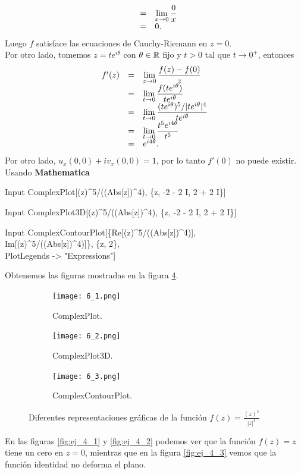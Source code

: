 \begin{Ejem}
\[\begin{array}{ccl}
			&=&\displaystyle\lim_{x\rightarrow 0}\dfrac{0}{x}\\
			&=&0.
		\end{array}
	\]	
	Luego $f$ satisface las ecuaciones de Cauchy-Riemann en $z=0$.\\
	Por otro lado, tomemos $z=te^{i\theta}$ con $\theta\in \mathbb{R}$ fijo y $t>0$  tal que $t\rightarrow0^{+}$, entonces
	\[
		\begin{array}{ccl}
			f'(z)&=&\displaystyle\lim_{z\rightarrow0}\displaystyle\dfrac{f(z)-f(0)}{z}\\
			&=&\displaystyle\lim_{t\rightarrow0}\dfrac{f(te^{i\theta})}{te^{i\theta}}\\
			&=&\displaystyle\lim_{t\rightarrow0}\dfrac{(te^{i\theta})^5/|te^{i\theta}|^4}{te^{i\theta}}\\
			&=&\displaystyle\lim_{t\rightarrow0}\dfrac{t^5e^{i4\theta}}{t^5}\\
			&=&e^{i4\theta}.
		\end{array}
	\]
	Por otro lado,  $u_x(0,0)+iv_x(0,0)=1$, por lo tanto $f'(0)$ no puede existir. \\
	Usando \textbf{Mathematica}
	\begin{mmaCell}{Input}
		ComplexPlot[(z)^5/((Abs[z])^4), \{z, -2 - 2 I, 2 + 2 I\}]
	\end{mmaCell}
	
	\begin{mmaCell}{Input}
		ComplexPlot3D[(z)^5/((Abs[z])^4), \{z, -2 - 2 I, 2 + 2 I\}]
	\end{mmaCell}
	
	\begin{mmaCell}{Input}
		ComplexContourPlot[\{Re[(z)^5/((Abs[z])^4)],\\Im[(z)^5/((Abs[z])^4)]\}, \{z, 2\},\\PlotLegends -> "Expressions"]
	\end{mmaCell}
	Obtenemos las figuras mostradas en la figura \ref{fig:ej_6}.\\	
	\begin{figure}[htbp!]
		\centering
		\begin{subfigure}{0.2\textwidth}
			\texttt{[image: 6\_1.png]}
			\caption{ComplexPlot.}
			\label{fig:ej_6_1}
		\end{subfigure}
		\begin{subfigure}{0.3\textwidth}
			\texttt{[image: 6\_2.png]}
			\caption{ComplexPlot3D.}
			\label{fig:ej_6_2}
		\end{subfigure}
		\begin{subfigure}{0.3\textwidth}
			\texttt{[image: 6\_3.png]}
			\caption{ComplexContourPlot.}
			\label{fig:ej_6_3}
		\end{subfigure}
		\caption{Diferentes representaciones gráficas de la función $f(z)=\frac{(z)^5}{|z|^4}$}
		\label{fig:ej_6}
	\end{figure}
	
	En las figuras \ref{fig:ej_4_1} y \ref{fig:ej_4_2} podemos ver que la función $f(z)=z$ tiene un cero en $z=0$, mientras que en la figura \ref{fig:ej_4_3} vemos que la función identidad no deforma el plano.
\end{Ejem} 

